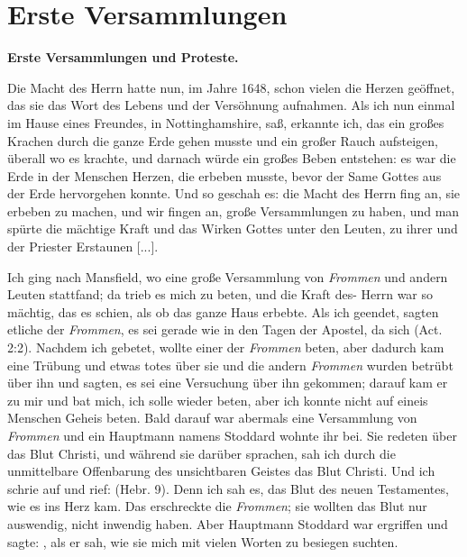 \chapter[Erste Versammlungen]{Erste Versammlungen}

\begin{center}
\textbf{Erste Versammlungen und Proteste.}
\end{center}

Die Macht des Herrn  hatte nun, im Jahre 1648, schon vielen
die Herzen geöffnet, das sie das Wort des Lebens und der 
Versöhnung aufnahmen. Als ich nun einmal im Hause eines Freundes,
in Nottinghamshire, saß, erkannte ich, das ein großes Krachen
durch die ganze Erde gehen musste und ein großer Rauch 
aufsteigen, überall wo es krachte, und darnach würde ein großes
Beben entstehen: es war die Erde in der Menschen Herzen, die
erbeben musste, bevor der Same Gottes aus der Erde 
hervorgehen konnte. Und so geschah es: die Macht des Herrn  fing an,
sie erbeben zu machen, und wir fingen an, große Versammlungen
zu haben, und man spürte die mächtige Kraft und das Wirken
Gottes unter den Leuten, zu ihrer und der Priester Erstaunen [...].

Ich ging nach Mansfield, wo eine große Versammlung von
\textit{Frommen} und andern Leuten stattfand; da trieb es mich zu
beten, und die Kraft des- Herrn  war so mächtig, das es schien,
als ob das ganze Haus erbebte. Als ich geendet, sagten etliche
der \textit{Frommen}, es sei gerade wie in den Tagen der Apostel, da
sich  
(Act. 2:2).
Nachdem ich gebetet, wollte einer der \textit{Frommen} beten, aber
dadurch kam eine Trübung und etwas totes über sie und die
andern \textit{Frommen} wurden betrübt über ihn und sagten, es sei
eine Versuchung über ihn gekommen; darauf kam er zu mir und
bat mich, ich solle wieder beten, aber ich konnte nicht auf 
eineis Menschen Geheis beten.
Bald darauf war abermals eine Versammlung von \textit{Frommen}
und ein Hauptmann namens Stoddard wohnte ihr bei. Sie
redeten über das Blut Christi, 
und während sie darüber sprachen,
sah ich durch die unmittelbare Offenbarung des unsichtbaren
Geistes das Blut Christi. Und ich schrie auf und rief:  (Hebr. 9). 
Denn ich sah es, das Blut des neuen Testamentes, 
wie es ins Herz kam. Das
erschreckte die \textit{Frommen}; sie wollten das Blut nur 
auswendig, nicht inwendig haben. Aber 
Hauptmann Stoddard war ergriffen
und sagte: , als er sah,
wie sie mich mit vielen Worten zu besiegen suchten.

